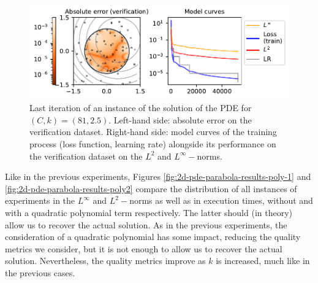 \documentclass[12pt]{report} %
\begin{document}
\begin{figure}[h]
  \includegraphics[width=\textwidth]{imagenes/experiments/2d/pde_parabola/parabola-TR15-C81-rrrrepetishon-E52502.pdf}
  \caption{Last iteration of an instance of the solution of the PDE for $(C,k)=(81,2.5)$. Left-hand side: absolute error on the verification dataset. Right-hand side: model curves of the training process (loss function, learning rate) alongside its performance on the verification dataset on the $L^2$ and $L^\infty-$norms.}
  \label{fig:2d-pde-usual-result}
\end{figure}

Like in the previous experiments, Figures \ref{fig:2d-pde-parabola-results-poly-1} and \ref{fig:2d-pde-parabola-results-poly2} compare the distribution of all instances of experiments in the $L^\infty$ and $L^2-$norms as well as in execution times, without and with a quadratic polynomial term respectively. The latter should (in theory) allow us to recover the actual solution. As in the previous experiments, the consideration of a quadratic polynomial has some impact, reducing the quality metrics we consider, but it is not enough to allow us to recover the actual solution. Nevertheless, the quality metrics improve as $k$ is increased, much like in the previous cases.
\end{document}
